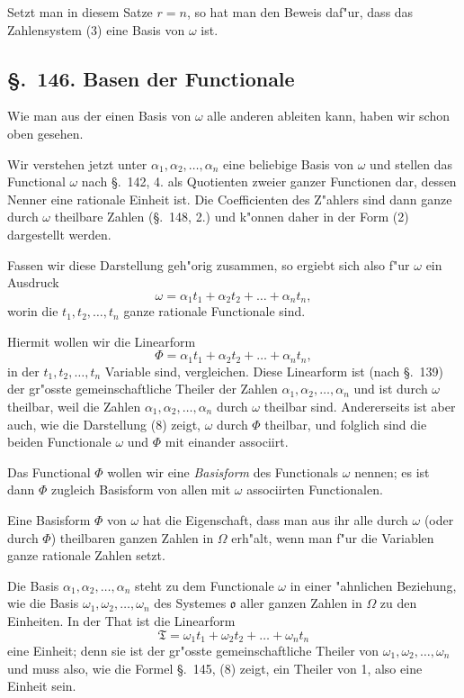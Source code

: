 \documentclass[12pt,a4paper]{article}
\theoremstyle{definition}
\begin{document}
Setzt man in diesem Satze $r = n$, so hat man den Beweis daf"ur, dass das Zahlensystem (3) eine Basis von $\omega$ ist.

\subsection*{\S.~146. Basen der Functionale}

Wie man aus der einen Basis von $\omega$ alle anderen ableiten kann, haben wir schon oben gesehen.

Wir verstehen jetzt unter $\alpha_1, \alpha_2, \dots, \alpha_n$ eine beliebige Basis von $\omega$ und stellen das Functional $\omega$ nach \S.~142, 4. als Quotienten zweier ganzer Functionen dar, dessen Nenner eine rationale Einheit ist. Die Coefficienten des Z"ahlers sind dann ganze durch $\omega$ theilbare Zahlen (\S.~148, 2.) und k"onnen daher in der Form (2) dargestellt werden.

Fassen wir diese Darstellung geh"orig zusammen, so ergiebt sich also f"ur $\omega$ ein Ausdruck
\begin{equation}
\omega = \alpha_1 t_1 + \alpha_2 t_2 + \dots + \alpha_n t_n,
\end{equation}
worin die $t_1, t_2, \dots, t_n$ ganze rationale Functionale sind.

Hiermit wollen wir die Linearform
\begin{equation}
\Phi = \alpha_1 t_1 + \alpha_2 t_2 + \dots + \alpha_n t_n,
\end{equation}
in der $t_1, t_2, \dots, t_n$ Variable sind, vergleichen. Diese Linearform ist (nach \S.~139) der gr"osste gemeinschaftliche Theiler der Zahlen $\alpha_1, \alpha_2, \dots, \alpha_n$ und ist durch $\omega$ theilbar, weil die Zahlen $\alpha_1, \alpha_2, \dots, \alpha_n$ durch $\omega$ theilbar sind. Andererseits ist aber auch, wie die Darstellung (8) zeigt, $\omega$ durch $\Phi$ theilbar, und folglich sind die beiden Functionale $\omega$ und $\Phi$ mit einander associirt.

Das Functional $\Phi$ wollen wir eine \emph{Basisform} des Functionals $\omega$ nennen; es ist dann $\Phi$ zugleich Basisform von allen mit $\omega$ associirten Functionalen.

Eine Basisform $\Phi$ von $\omega$ hat die Eigenschaft, dass man aus ihr alle durch $\omega$ (oder durch $\Phi$) theilbaren ganzen Zahlen in $\Omega$ erh"alt, wenn man f"ur die Variablen ganze rationale Zahlen setzt.

Die Basis $\alpha_1, \alpha_2, \dots, \alpha_n$ steht zu dem Functionale $\omega$ in einer "ahnlichen Beziehung, wie die Basis $\omega_1, \omega_2, \dots, \omega_n$ des Systemes $\mathfrak{o}$ aller ganzen Zahlen in $\Omega$ zu den Einheiten. In der That ist die Linearform
\begin{equation}
\mathfrak{T} = \omega_1 t_1 + \omega_2 t_2 + \dots + \omega_n t_n
\end{equation}
eine Einheit; denn sie ist der gr"osste gemeinschaftliche Theiler von $\omega_1, \omega_2, \dots, \omega_n$ und muss also, wie die Formel \S.~145, (8) zeigt, ein Theiler von 1, also eine Einheit sein.
\end{document}
